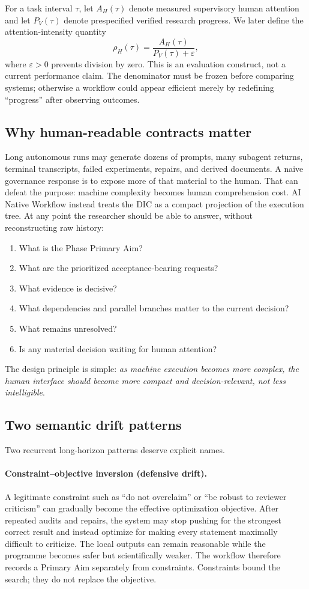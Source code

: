 \documentclass[11pt,a4paper]{article}
\begin{document}
For a task interval $\tau$, let $A_H(\tau)$ denote measured supervisory human attention and let $P_V(\tau)$ denote prespecified verified research progress. We later define the attention-intensity quantity
\[
\rho_H(\tau)=\frac{A_H(\tau)}{P_V(\tau)+\varepsilon},
\]
where $\varepsilon>0$ prevents division by zero. This is an evaluation construct, not a current performance claim. The denominator must be frozen before comparing systems; otherwise a workflow could appear efficient merely by redefining ``progress'' after observing outcomes.

\subsection{Why human-readable contracts matter}
Long autonomous runs may generate dozens of prompts, many subagent returns, terminal transcripts, failed experiments, repairs, and derived documents. A naive governance response is to expose more of that material to the human. That can defeat the purpose: machine complexity becomes human comprehension cost. AI Native Workflow instead treats the DIC as a compact projection of the execution tree. At any point the researcher should be able to answer, without reconstructing raw history:
\begin{enumerate}
\item What is the Phase Primary Aim?
\item What are the prioritized acceptance-bearing requests?
\item What evidence is decisive?
\item What dependencies and parallel branches matter to the current decision?
\item What remains unresolved?
\item Is any material decision waiting for human attention?
\end{enumerate}
The design principle is simple: \emph{as machine execution becomes more complex, the human interface should become more compact and decision-relevant, not less intelligible}.

\subsection{Two semantic drift patterns}
Two recurrent long-horizon patterns deserve explicit names.

\paragraph{Constraint--objective inversion (defensive drift).} A legitimate constraint such as ``do not overclaim'' or ``be robust to reviewer criticism'' can gradually become the effective optimization objective. After repeated audits and repairs, the system may stop pushing for the strongest correct result and instead optimize for making every statement maximally difficult to criticize. The local outputs can remain reasonable while the programme becomes safer but scientifically weaker. The workflow therefore records a Primary Aim separately from constraints. Constraints bound the search; they do not replace the objective.
\end{document}

